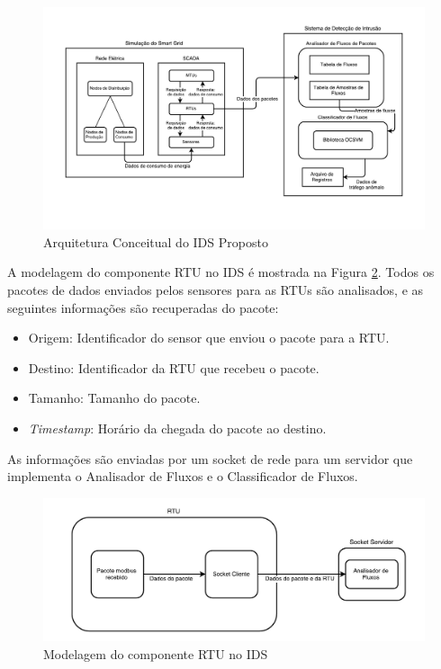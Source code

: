 \documentclass[cic,tc]{iiufrgs}
\begin{document}
\begin{figure}[h]
   \caption{Arquitetura Conceitual do IDS Proposto}
   \begin{center}
       \includegraphics[width=34em]{sdi_diagram}
   \end{center}
   \label{sdi_diagram}
\end{figure}

A modelagem do componente RTU no IDS é mostrada na Figura \ref{modelrtu}. Todos os pacotes de dados enviados pelos sensores para as RTUs são analisados, e as seguintes informações são recuperadas do pacote:
\begin{itemize}
\item{Origem}: Identificador do sensor que enviou o pacote para a RTU.
\item{Destino}: Identificador da RTU que recebeu o pacote.
\item{Tamanho}: Tamanho do pacote.
\item{\emph{Timestamp}}: Horário da chegada do pacote ao destino.
\end{itemize}
As informações são enviadas por um socket de rede para um servidor que implementa o Analisador de Fluxos e o Classificador de Fluxos.

\begin{figure}[h]
   \caption{Modelagem do componente RTU no IDS}
   \begin{center}
       \includegraphics[width=34em]{modelrtu}
   \end{center}
   \label{modelrtu}
\end{figure}
\end{document}
